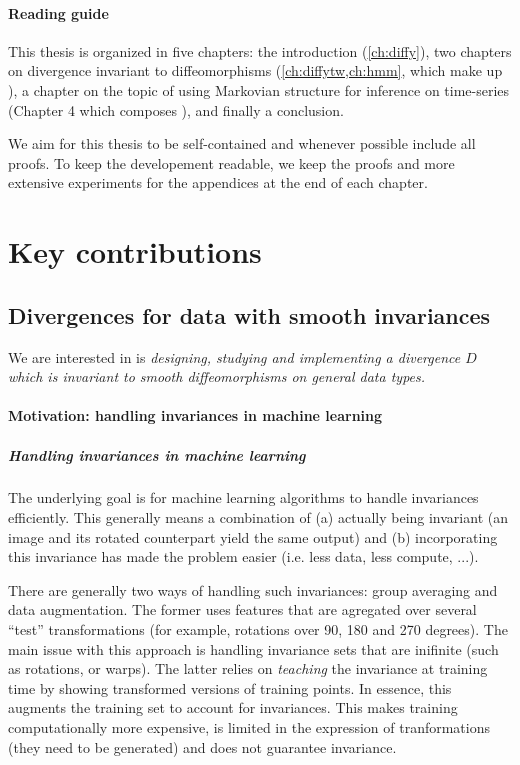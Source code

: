 \paragraph{Reading guide}

This thesis is organized in five chapters: the introduction (\cref{ch:diffy}), two chapters on divergence invariant to diffeomorphisms (\cref{ch:diffytw,ch:hmm}, which make up ), a chapter on the topic of using Markovian structure for inference on time-series (Chapter 4 which composes ), and finally a conclusion.

We aim for this thesis to be self-contained and whenever possible include all proofs. To keep the developement readable, we keep the proofs and more extensive experiments for the appendices at the end of each chapter.

\section{Key contributions}
\subsection{Divergences for data with smooth invariances}

We are interested in is \emph{designing, studying and implementing a divergence $D$ which is invariant to smooth diffeomorphisms on general data types.}

\paragraph{Motivation: handling invariances in machine learning}

\subparagraph{Handling invariances in machine learning}
The underlying goal is for machine learning algorithms to handle invariances efficiently. This generally means a combination of (a) actually being invariant (an image and its rotated counterpart yield the same output) and (b) incorporating this invariance has made the problem easier (i.e. less data, less compute, ...).

There are generally two ways of handling such invariances: group averaging and data augmentation. The former uses features that are agregated over several ``test'' transformations (for example, rotations over 90, 180 and 270 degrees). The main issue with this approach is handling invariance sets that are inifinite (such as rotations, or warps). The latter relies on \emph{teaching} the invariance at training time by showing transformed versions of training points. In essence, this augments the training set to account for invariances. This makes training computationally more expensive, is limited in the expression of tranformations (they need to be generated) and does not guarantee invariance.

